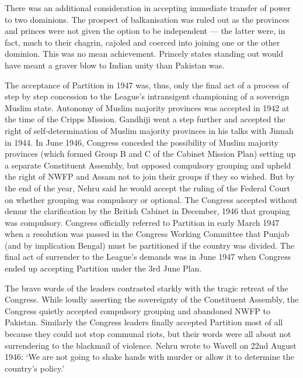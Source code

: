 There was an additional consideration in accepting immediate transfer of power to two dominions. The prospect of balkanisation was ruled out as the provinces and princes were not given the option to be independent --- the latter were, in fact, much to their chagrin, cajoled and coerced into joining one or the other dominion. This was no mean achievement. Princely states standing out would have meant a graver blow to Indian unity than Pakistan was. 

The acceptance of Partition in 1947 was, thus, only the final act of a process of step by step concession to the League's intransigent championing of a sovereign Muslim state. Autonomy of Muslim majority provinces was accepted in 1942 at the time of the Cripps Mission. Gandhiji went a step further and accepted the right of self-determination of Muslim majority provinces in his talks with Jinnah in 1944. In June 1946, Congress conceded the possibility of Muslim majority provinces (which formed Group B and C of the Cabinet Mission Plan) setting up a separate Constituent Assembly, but opposed compulsory grouping and upheld the right of NWFP and Assam not to join their groups if they so wished. But by the end of the year, Nehru said he would accept the ruling of the Federal Court on whether grouping was compulsory or optional. The Congress accepted without demur the clarification by the British Cabinet in December, 1946 that grouping was compulsory. Congress officially referred to Partition in early March 1947 when a resolution was passed in the Congress Working Committee that Punjab (and by implication Bengal) must be partitioned if the country was divided. The final act of surrender to the League's demands was in June 1947 when Congress ended up accepting Partition under the 3rd June Plan. 

The brave words of the leaders contrasted starkly with the tragic retreat of the Congress. While loudly asserting the sovereignty of the Constituent Assembly, the Congress quietly accepted compulsory grouping and abandoned NWFP to Pakistan. Similarly the Congress leaders finally accepted Partition most of all because they could not stop communal riots, but their words were all about not surrendering to the blackmail of violence. Nehru wrote to Wavell on 22nd August 1946: `We are not going to shake hands with murder or allow it to determine the country's policy.' 


